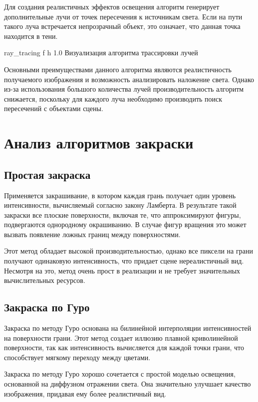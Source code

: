 Для создания реалистичных эффектов освещения алгоритм генерирует дополнительные лучи от точек пересечения к источникам света. 
Если на пути такого луча встречается непрозрачный объект, это означает, что данная точка находится в тени.

    {ray_tracing}
    {f}
    {h}
    {1.0\textwidth}
    {Визуализация алгоритма трассировки лучей~\cite{tracing}}

Основными преимуществами данного алгоритма являются реалистичность получаемого изображения и возможность анализировать наложение света. 
Однако из-за использования большого количества лучей производительность алгоритм снижается, поскольку для каждого луча необходимо производить поиск пересечений с объектами сцены.

\section{Анализ алгоритмов закраски}

\subsection{Простая закраска}
Применяется закрашивание, в котором каждая грань получает один уровень интенсивности, вычисляемый согласно закону Ламберта. 
В результате такой закраски все плоские поверхности, включая те, что аппроксимируют фигуры, подвергаются однородному окрашиванию. 
В случае фигур вращения это может вызвать появление ложных границ между поверхностями.

Этот метод обладает высокой производительностью, однако все пиксели на грани получают одинаковую интенсивность, что придает сцене нереалистичный вид. 
Несмотря на это, метод очень прост в реализации и не требует значительных вычислительных ресурсов.

\subsection{Закраска по Гуро}

Закраска по методу Гуро основана на билинейной интерполяции интенсивностей на поверхности грани. 
Этот метод создает иллюзию плавной криволинейной поверхности, так как интенсивность вычисляется для каждой точки грани, что способствует мягкому переходу между цветами.

Закраска по методу Гуро хорошо сочетается с простой моделью освещения, основанной на диффузном отражении света. 
Она значительно улучшает качество изображения, придавая ему более реалистичный вид.

